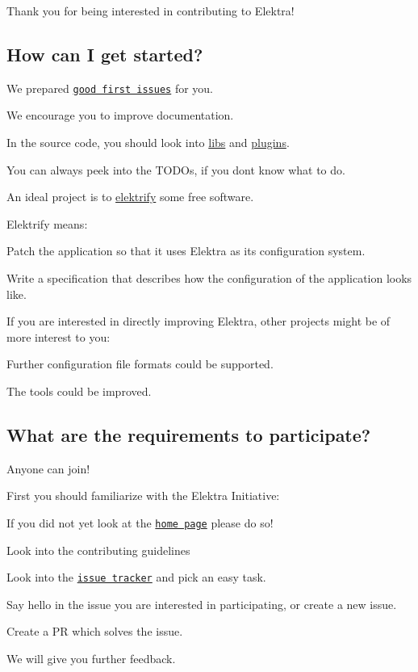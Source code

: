 Thank you for being interested in contributing to Elektra!

\subsection*{How can I get started?}

We prepared \href{https://github.com/ElektraInitiative/libelektra/issues?q=is%3Aissue+is%3Aopen+label%3A%22good+first+issue%22}{\tt good first issues} for you.


\begin{DoxyItemize}
\item We encourage you to improve documentation.
\item In the source code, you should look into \hyperlink{src_libs_README_md}{libs} and \hyperlink{src_plugins_README_md}{plugins}.
\item You can always peek into the T\+O\+D\+Os, if you don\textquotesingle{}t know what to do.
\item An ideal project is to \hyperlink{doc_help_elektra-glossary_md}{elektrify} some free software.
\end{DoxyItemize}

Elektrify means\+:


\begin{DoxyItemize}
\item Patch the application so that it uses Elektra as its configuration system.
\item Write a specification that describes how the configuration of the application looks like.
\end{DoxyItemize}

If you are interested in directly improving Elektra, other projects might be of more interest to you\+:


\begin{DoxyItemize}
\item Further configuration file formats could be supported.
\item The tools could be improved.
\end{DoxyItemize}

\subsection*{What are the requirements to participate?}

Anyone can join!

First you should familiarize with the Elektra Initiative\+:


\begin{DoxyItemize}
\item If you did not yet look at the \href{https://www.libelektra.org/}{\tt home page} please do so!
\item Look into the contributing guidelines
\item Look into the \href{https://issues.libelektra.org/}{\tt issue tracker} and pick an easy task.
\item Say hello in the issue you are interested in participating, or create a new issue.
\item Create a PR which solves the issue.
\item We will give you further feedback. 
\end{DoxyItemize}